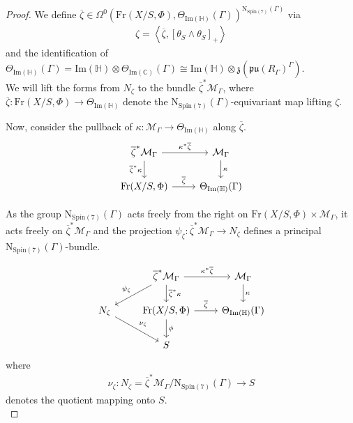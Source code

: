 \documentclass[10pt,a4paper]{amsart}
\newcommand{\m}[1]{{\mathrm{#1}}}
\begin{document}
\begin{proof}
We define $\overline{\zeta}\in\Omega^0(\m{Fr}(X/S,\Phi),\Theta_{\m{Im}(\mathbb{H})}(\Gamma))^{\m{N}_{\m{Spin}(7)}(\Gamma)}$ via 
\begin{align*}
    \zeta=\left<\overline{\zeta},\left[\theta_{S}\wedge\theta_S\right]_+\right>
\end{align*}
and the identification of $\Theta_{\m{Im}(\mathbb{H})}(\Gamma)=\m{Im}(\mathbb{H})\otimes\Theta_{\m{Im}(\mathbb{C})}(\Gamma)\cong \m{Im}(\mathbb{H})\otimes \mathfrak{z}(\mathfrak{pu}(R_\Gamma)^{\Gamma})$.\\

We will lift the forms from $N_\zeta$ to the bundle $\overline{\zeta}^*\mathcal{M}_\Gamma$, where $\overline{\zeta}\colon \m{Fr}(X/S,\Phi)\rightarrow \Theta_{\m{Im}(\mathbb{H})}$ denote the $\m{N}_{\m{Spin}(7)}(\Gamma)$-equivariant map lifting $\zeta$.


Now, consider the pullback of $\kappa \colon\mathcal{M}_\Gamma\rightarrow \Theta_{\m{Im}(\mathbb{H})}$ along $\overline{\zeta}$.
    \begin{equation*}
         \begin{tikzcd}
            \overline{\zeta}^*\mathcal{M}_\Gamma\arrow[r,"\kappa^*\overline{\zeta}"]\arrow[d,swap,"\overline{\zeta}^*\kappa"]&\mathcal{M}_\Gamma\arrow[d,"\kappa"]\\
            \m{Fr}(X/S,\Phi)\arrow[r,"\overline{\zeta}"]&\Theta_{\m{Im}(\mathbb{H})}(\Gamma)
        \end{tikzcd}
    \end{equation*}

As the group $\m{N}_{\m{Spin}(7)}(\Gamma)$ acts freely from the right on $\m{Fr}(X/S,\Phi)\times \mathcal{M}_\Gamma$, it acts freely on $\overline{\zeta}^*\mathcal{M}_\Gamma$ and the projection $\psi_\zeta \colon\overline{\zeta}^*\mathcal{M}_\Gamma\rightarrow N_\zeta$ defines a principal $\m{N}_{\m{Spin}(7)}(\Gamma)$-bundle.

\begin{equation*}
    \begin{tikzcd}
        &\overline{\zeta}^*\mathcal{M}_\Gamma\arrow[dl,swap,"\psi_\zeta"]\arrow[r,"\kappa^*\overline{\zeta}"]\arrow[d,"\overline{\zeta}^*\kappa"]&\mathcal{M}_\Gamma\arrow[d,"\kappa"]\\
        N_\zeta\arrow[dr,"\nu_\zeta"]&\m{Fr}(X/S,\Phi)\arrow[r,"\overline{\zeta}"]\arrow[d,"\phi"]&\Theta_{\m{Im}(\mathbb{H})}(\Gamma)\\
        &S&
    \end{tikzcd}
\end{equation*}
where 
\begin{align*}
    \nu_\zeta\colon N_\zeta=\overline{\zeta}^*\mathcal{M}_\Gamma/\m{N}_{\m{Spin}(7)}(\Gamma)\rightarrow S
\end{align*}
denotes the quotient mapping onto $S$.\\


\end{proof}
\end{document}
